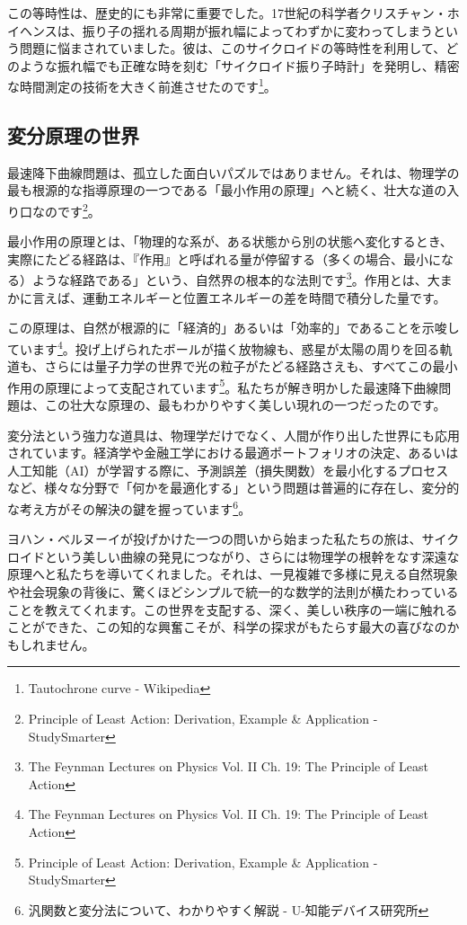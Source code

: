 \documentclass[a4paper,12pt]{bxjsarticle}
\begin{document}
この等時性は、歴史的にも非常に重要でした。17世紀の科学者クリスチャン・ホイヘンスは、振り子の揺れる周期が振れ幅によってわずかに変わってしまうという問題に悩まされていました。彼は、このサイクロイドの等時性を利用して、どのような振れ幅でも正確な時を刻む「サイクロイド振り子時計」を発明し、精密な時間測定の技術を大きく前進させたのです\footnote{Tautochrone curve - Wikipedia}。

\subsection{変分原理の世界}

最速降下曲線問題は、孤立した面白いパズルではありません。それは、物理学の最も根源的な指導原理の一つである「最小作用の原理」へと続く、壮大な道の入り口なのです\footnote{Principle of Least Action: Derivation, Example \& Application - StudySmarter}。

最小作用の原理とは、「物理的な系が、ある状態から別の状態へ変化するとき、実際にたどる経路は、『作用』と呼ばれる量が停留する（多くの場合、最小になる）ような経路である」という、自然界の根本的な法則です\footnote{The Feynman Lectures on Physics Vol. II Ch. 19: The Principle of Least Action}。作用とは、大まかに言えば、運動エネルギーと位置エネルギーの差を時間で積分した量です。

この原理は、自然が根源的に「経済的」あるいは「効率的」であることを示唆しています\footnote{The Feynman Lectures on Physics Vol. II Ch. 19: The Principle of Least Action}。投げ上げられたボールが描く放物線も、惑星が太陽の周りを回る軌道も、さらには量子力学の世界で光の粒子がたどる経路さえも、すべてこの最小作用の原理によって支配されています\footnote{Principle of Least Action: Derivation, Example \& Application - StudySmarter}。私たちが解き明かした最速降下曲線問題は、この壮大な原理の、最もわかりやすく美しい現れの一つだったのです。

変分法という強力な道具は、物理学だけでなく、人間が作り出した世界にも応用されています。経済学や金融工学における最適ポートフォリオの決定、あるいは人工知能（AI）が学習する際に、予測誤差（損失関数）を最小化するプロセスなど、様々な分野で「何かを最適化する」という問題は普遍的に存在し、変分的な考え方がその解決の鍵を握っています\footnote{汎関数と変分法について、わかりやすく解説 - U-知能デバイス研究所}。

ヨハン・ベルヌーイが投げかけた一つの問いから始まった私たちの旅は、サイクロイドという美しい曲線の発見につながり、さらには物理学の根幹をなす深遠な原理へと私たちを導いてくれました。それは、一見複雑で多様に見える自然現象や社会現象の背後に、驚くほどシンプルで統一的な数学的法則が横たわっていることを教えてくれます。この世界を支配する、深く、美しい秩序の一端に触れることができた、この知的な興奮こそが、科学の探求がもたらす最大の喜びなのかもしれません。
\end{document}
